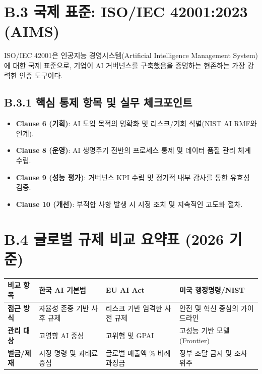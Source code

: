 \section*{B.3 국제 표준: ISO/IEC 42001:2023 (AIMS)}

ISO/IEC 42001은 인공지능 경영시스템(Artificial Intelligence Management System)에 대한 국제 표준으로, 기업이 AI 거버넌스를 구축했음을 증명하는 현존하는 가장 강력한 인증 도구이다.

\subsection*{B.3.1 핵심 통제 항목 및 실무 체크포인트}
\begin{itemize}
    \item \textbf{Clause 6 (기획)}: AI 도입 목적의 명확화 및 리스크/기회 식별(NIST AI RMF와 연계).
    \item \textbf{Clause 8 (운영)}: AI 생명주기 전반의 프로세스 통제 및 데이터 품질 관리 체계 수립.
    \item \textbf{Clause 9 (성능 평가)}: 거버넌스 KPI 수립 및 정기적 내부 감사를 통한 유효성 검증.
    \item \textbf{Clause 10 (개선)}: 부적합 사항 발생 시 시정 조치 및 지속적인 고도화 절차.
\end{itemize}

\section*{B.4 글로벌 규제 비교 요약표 (2026 기준)}

\begin{table}[htbp]
\centering
\begin{tabularx}{\textwidth}{lXXX}
\toprule
\textbf{비교 항목} & \textbf{한국 AI 기본법} & \textbf{EU AI Act} & \textbf{미국 행정명령/NIST} \\
\midrule
\textbf{접근 방식} & 자율성 존중 기반 사후 규제 & 리스크 기반 엄격한 사전 규제 & 안전 및 혁신 중심의 가이드라인 \\
\midrule
\textbf{관리 대상} & 고영향 AI 중심 & 고위험 및 GPAI & 고성능 기반 모델(Frontier) \\
\midrule
\textbf{벌금/제재} & 시정 명령 및 과태료 중심 & 글로벌 매출액 \% 비례 과징금 & 정부 조달 금지 및 조사 위주 \\
\bottomrule
\end{tabularx}
\end{table}
